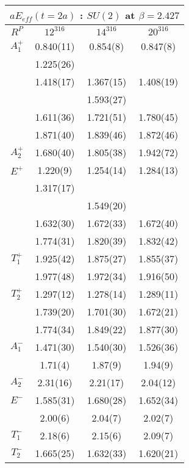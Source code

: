 \documentclass[12pt]{article}
\begin{document}
\begin{table}[htb]
\centering
\begin{tabular}{|c|c|c|c|} \hline
\multicolumn{4}{|c|}{$aE_{eff}(t=2a)$ : $SU(2)$ at $\beta=2.427$} \\ \hline
  $R^{P}$  &  $12^316$ & $14^316$  &  $20^316$  \\ \hline
$A_1^{+}$  & 0.840(11)   & 0.854(8) & 0.847(8)  \\
           & 1.225(26)   &           &            \\ 
           & 1.418(17)   & 1.367(15) & 1.408(19)  \\ 
           &             & 1.593(27) &            \\ 
           & 1.611(36)   & 1.721(51) & 1.780(45)  \\ 
           & 1.871(40)   & 1.839(46) & 1.872(46)  \\  \hline
$A_2^{+}$  & 1.680(40)   & 1.805(38) & 1.942(72)  \\  \hline
$E^{+}$    & 1.220(9)    & 1.254(14) & 1.284(13)  \\
           & 1.317(17)   &           &            \\ 
           &             & 1.549(20) &            \\ 
           & 1.632(30)   & 1.672(33) &  1.672(40) \\ 
           & 1.774(31)   & 1.820(39) &  1.832(42) \\   \hline
$T_1^{+}$  & 1.925(42)   & 1.875(27) & 1.855(37)  \\ 
           & 1.977(48)   & 1.972(34) & 1.916(50)  \\  \hline
$T_2^{+}$  & 1.297(12)   & 1.278(14) & 1.289(11)  \\ 
           & 1.739(20)   & 1.701(30) & 1.672(21)  \\ 
           & 1.774(34)   & 1.849(22) & 1.877(30)  \\  \hline
$A_1^{-}$  & 1.471(30)   & 1.540(30) & 1.526(36)  \\
           & 1.71(4)     & 1.87(9)   & 1.94(9)  \\  \hline
$A_2^{-}$  & 2.31(16)   & 2.21(17)   & 2.04(12)  \\  \hline
$E^{-}$    & 1.585(31)   & 1.680(28) & 1.652(34)  \\
           &  2.00(6)    & 2.04(7)   & 2.02(7)  \\ \hline
$T_1^{-}$  &  2.18(6)    & 2.15(6)   & 2.09(7)  \\ \hline
$T_2^{-}$  &  1.665(25)  & 1.632(33) & 1.620(21)  \\

\end{tabular}
\end{table}
\end{document}
